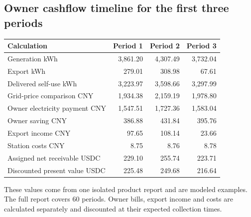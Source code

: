 \documentclass[12pt,a4paper]{article}
\begin{document}
\clearpage\begin{landscape}
\subsection{Owner cashflow timeline for the first three periods}
\begin{center}\end{center}\begin{center}\begin{tabular}{L{10cm}rrr}\toprule Calculation & Period 1 & Period 2 & Period 3\\\midrule
Generation kWh & 3,861.20 & 4,307.49 & 3,732.04\\
Export kWh & 279.01 & 308.98 & 67.61\\
Delivered self-use kWh & 3,223.97 & 3,598.66 & 3,297.99\\
Grid-price comparison CNY & 1,934.38 & 2,159.19 & 1,978.80\\
Owner electricity payment CNY & 1,547.51 & 1,727.36 & 1,583.04\\
Owner saving CNY & 386.88 & 431.84 & 395.76\\
Export income CNY & 97.65 & 108.14 & 23.66\\
Station costs CNY & 8.75 & 8.76 & 8.78\\
Assigned net receivable USDC & 229.10 & 255.74 & 223.71\\
Discounted present value USDC & 225.48 & 249.68 & 216.64\\
\bottomrule\end{tabular}\end{center}
These values come from one isolated product report and are modeled examples. The full report covers 60 periods. Owner bills, export income and costs are calculated separately and discounted at their expected collection times.

\end{landscape}
\end{document}
